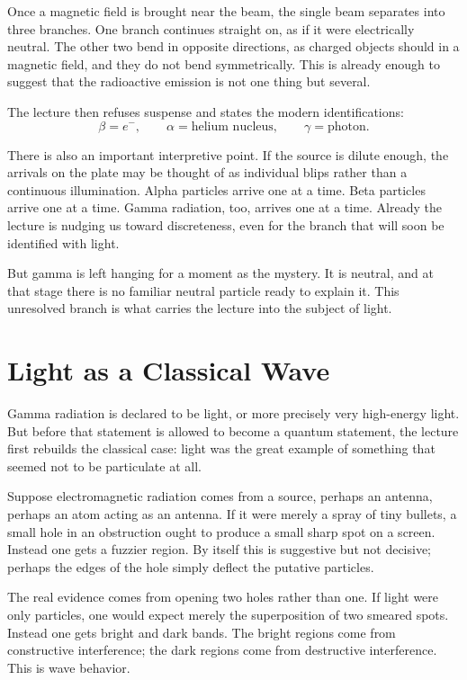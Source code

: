 Once a magnetic field is brought near the beam, the single beam separates into three branches. One branch continues straight on, as if it were electrically neutral. The other two bend in opposite directions, as charged objects should in a magnetic field, and they do not bend symmetrically. This is already enough to suggest that the radioactive emission is not one thing but several.

The lecture then refuses suspense and states the modern identifications:
\begin{equation}
\beta = e^-,
\qquad
\alpha = \text{helium nucleus},
\qquad
\gamma = \text{photon}.
\end{equation}

There is also an important interpretive point. If the source is dilute enough, the arrivals on the plate may be thought of as individual blips rather than a continuous illumination. Alpha particles arrive one at a time. Beta particles arrive one at a time. Gamma radiation, too, arrives one at a time. Already the lecture is nudging us toward discreteness, even for the branch that will soon be identified with light.

But gamma is left hanging for a moment as the mystery. It is neutral, and at that stage there is no familiar neutral particle ready to explain it. This unresolved branch is what carries the lecture into the subject of light.

\section{Light as a Classical Wave}

Gamma radiation is declared to be light, or more precisely very high-energy light. But before that statement is allowed to become a quantum statement, the lecture first rebuilds the classical case: light was the great example of something that seemed not to be particulate at all.

Suppose electromagnetic radiation comes from a source, perhaps an antenna, perhaps an atom acting as an antenna. If it were merely a spray of tiny bullets, a small hole in an obstruction ought to produce a small sharp spot on a screen. Instead one gets a fuzzier region. By itself this is suggestive but not decisive; perhaps the edges of the hole simply deflect the putative particles.

The real evidence comes from opening two holes rather than one. If light were only particles, one would expect merely the superposition of two smeared spots. Instead one gets bright and dark bands. The bright regions come from constructive interference; the dark regions come from destructive interference. This is wave behavior.

